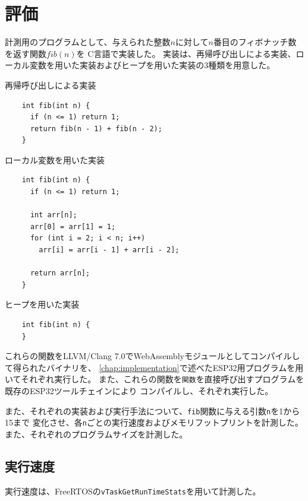 \chapter{評価}
\label{chap:evaluation}

計測用のプログラムとして、与えられた整数$n$に対して$n$番目のフィボナッチ数を返す関数$fib(n)$を
C言語で実装した。
実装は、再帰呼び出しによる実装、ローカル変数を用いた実装およびヒープを用いた実装の3種類を用意した。

\begin{itembox}[l]{再帰呼び出しによる実装}
  \begin{verbatim}
    int fib(int n) {
      if (n <= 1) return 1;
      return fib(n - 1) + fib(n - 2);
    }
  \end{verbatim}
\end{itembox}

\begin{itembox}[l]{ローカル変数を用いた実装}
  \begin{verbatim}
    int fib(int n) {
      if (n <= 1) return 1;

      int arr[n];
      arr[0] = arr[1] = 1;
      for (int i = 2; i < n; i++)
        arr[i] = arr[i - 1] + arr[i - 2];

      return arr[n];
    }
  \end{verbatim}
\end{itembox}

\begin{itembox}[l]{ヒープを用いた実装}
  \begin{verbatim}
    int fib(int n) {
    }
  \end{verbatim}
\end{itembox}

これらの関数をLLVM/Clang 7.0でWebAssemblyモジュールとしてコンパイルして得られたバイナリを、
\ref{chap:implementation}で述べたESP32用プログラムを用いてそれぞれ実行した。
また、これらの関数を\verb|関数|を直接呼び出すプログラムを既存のESP32ツールチェインにより
コンパイルし、それぞれ実行した。

また、それぞれの実装および実行手法について、\verb|fib|関数に与える引数\verb|n|を1から15まで
変化させ、各\verb|n|ごとの実行速度およびメモリフットプリントを計測した。
また、それぞれのプログラムサイズを計測した。

\section{実行速度}

実行速度は、FreeRTOSの\verb|vTaskGetRunTimeStats|を用いて計測した。


